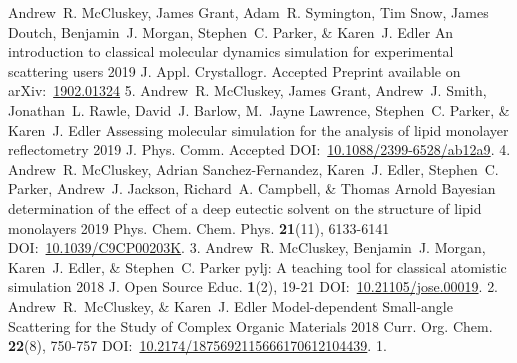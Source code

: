 \begin{cvpubys}
  \cvpuby
    {Andrew~R. McCluskey, James Grant, Adam~R. Symington, Tim Snow, James Doutch, Benjamin~J. Morgan, Stephen~C. Parker, \& Karen~J. Edler}
    {An introduction to classical molecular dynamics simulation for experimental scattering users}
    {2019}
    {J. Appl. Crystallogr.}
    {Accepted}
    {Preprint available on arXiv:~\href{https://arxiv.org/abs/1902.01324}{1902.01324}}
    {5.}
  \cvpuby
    {Andrew~R. McCluskey, James Grant, Andrew~J. Smith, Jonathan~L. Rawle, David~J. Barlow, M.~Jayne Lawrence, Stephen~C. Parker, \& Karen~J. Edler}
    {Assessing molecular simulation for the analysis of lipid monolayer reflectometry}
    {2019}
    {J. Phys. Comm.}
    {Accepted}
    {DOI:~\href{https://doi.org/10.1088/2399-6528/ab12a9}{10.1088/2399-6528/ab12a9}.}
    {4.}
  \cvpuby
    {Andrew~R. McCluskey, Adrian Sanchez-Fernandez, Karen~J. Edler, Stephen~C. Parker, Andrew~J. Jackson, Richard~A. Campbell, \& Thomas Arnold}
    {Bayesian determination of the effect of a deep eutectic solvent on the structure of lipid monolayers}
    {2019}
    {Phys. Chem. Chem. Phys.}
    {\textbf{21}(11), 6133-6141}
    {DOI:~\href{https://doi.org/10.1039/C9CP00203K}{10.1039/C9CP00203K}.}
    {3.}
  \cvpuby
    {Andrew~R. McCluskey, Benjamin~J. Morgan, Karen~J. Edler, \& Stephen~C. Parker}
    {pylj: A teaching tool for classical atomistic simulation}
    {2018}
    {J. Open Source Educ.}
    {\textbf{1}(2), 19-21}
    {DOI:~\href{http://doi.org/10.21105/jose.00019}{10.21105/jose.00019}.}
    {2.}
  \cvpuby
    {Andrew~R.~McCluskey, \& Karen~J. Edler}
    {Model-dependent Small-angle Scattering for the Study of Complex Organic Materials}
    {2018}
    {Curr. Org. Chem.}
    {\textbf{22}(8), 750-757}
    {DOI:~\href{http://doi.org/10.2174/1875692115666170612104439}{10.2174/1875692115666170612104439}.}
    {1.}
\end{cvpubys}
